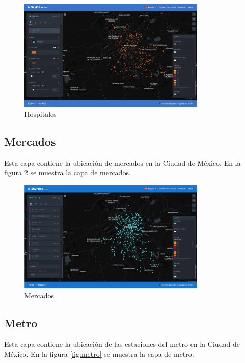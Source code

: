\begin{figure}[H]
    \centering
    \includegraphics[width=0.8\textwidth]{imagenes/05-mapa-interactivo/hospitales.png}
    \caption{Hospitales}
    \label{fig:hospitales}
\end{figure}

\subsection{Mercados}
Esta capa contiene la ubicación de mercados en la Ciudad de México. En la figura
\ref{fig:mercados} se muestra la capa de mercados.

\begin{figure}[H]
    \centering
    \includegraphics[width=0.8\textwidth]{imagenes/05-mapa-interactivo/mercados.png}
    \caption{Mercados}
    \label{fig:mercados}
\end{figure}

\subsection{Metro}
Esta capa contiene la ubicación de las estaciones del metro en la Ciudad de México.
En la figura \ref{fig:metro} se muestra la capa de metro.

